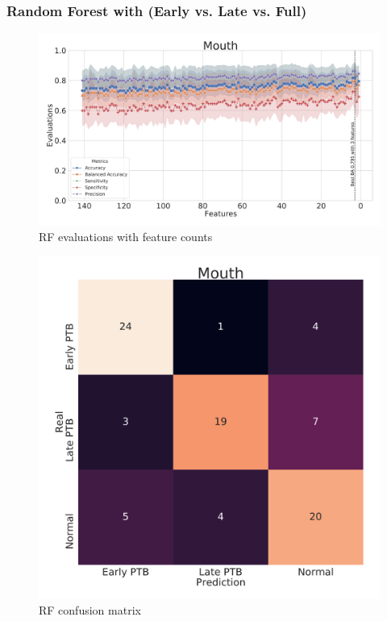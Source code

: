 \documentclass{beamer}
\begin{document}
    \begin{frame}[allowframebreaks]
        \frametitle{Random Forest with (Early vs. Late vs. Full)}

        \begin{figure}
            \includegraphics[width=0.8 \linewidth]{figures/RandomForest/RF.DADA2.homd.uncorrected/Mouth+metrics.pdf}
            \caption{RF evaluations with feature counts}
        \end{figure}

        \begin{figure}
            \includegraphics[width=0.5 \linewidth]{figures/RandomForest/RF.DADA2.homd.uncorrected/Mouth+heatmap.pdf}
            \caption{RF confusion matrix}
        \end{figure}


\end{frame}
\end{document}
